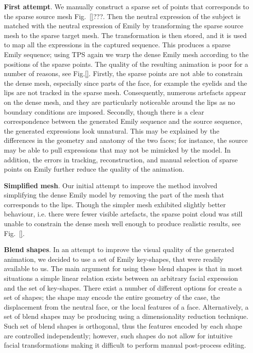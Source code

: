 \documentclass[11pt]{report}
\begin{document}
\textbf{First attempt}. We manually construct a sparse set of points that corresponds to the sparse source mesh Fig.~\ref{}???. Then the neutral expression of the subject is matched with the neutral expression of Emily by transforming the sparse source mesh to the sparse target mesh. The transformation is then stored, and it is used to map all the expressions in the captured sequence. This produces a sparse Emily sequence; using TPS again we warp the dense Emily mesh according to the positions of the sparse points. The quality of the resulting animation is poor for a number of reasons, see Fig.\ref{}. Firstly, the sparse points are not able to constrain the dense mesh, especially since parts of the face, for example the eyelids and the lips are not tracked in the sparse mesh. Consequently, numerous artefacts appear on the dense mesh, and they are particularly noticeable around the lips as no boundary conditions are imposed. Secondly, though there is a clear correspondence between the generated Emily sequence and the source sequence, the generated expressions look unnatural. This may be explained by the differences in the geometry and anatomy of the two faces; for instance, the source may be able to pull expressions that may not be mimicked by the model. In addition, the errors in tracking, reconstruction, and manual selection of sparse points on Emily further reduce the quality of the animation.

\textbf{Simplified mesh}. Our initial attempt to improve the method involved simplifying the dense Emily model by removing the part of the mesh that corresponds to the lips. Though the simpler mesh exhibited slightly better behaviour, i.e. there were fewer visible artefacts, the sparse point cloud was still unable to constrain the dense mesh well enough to produce realistic results, see Fig.~\ref{}. 

\textbf{Blend shapes}. In an attempt to improve the visual quality of the generated animation, we decided to use a set of Emily key-shapes, that were readily available to us. The main argument for using these blend shapes is that in most situations a simple linear relation exists between an arbitrary facial expression and the set of key-shapes. There exist a number of different options for create a set of shapes; the shape may encode the entire geometry of the case, the displacement from the neutral face, or the local features of a face. Alternatively, a set of blend shapes may be producing using a dimensionality reduction technique. Such set of blend shapes is orthogonal, thus the features encoded by each shape are controlled independently; however, such shapes do not allow for intuitive facial transformations making it difficult to perform manual post-process editing.
\end{document}
